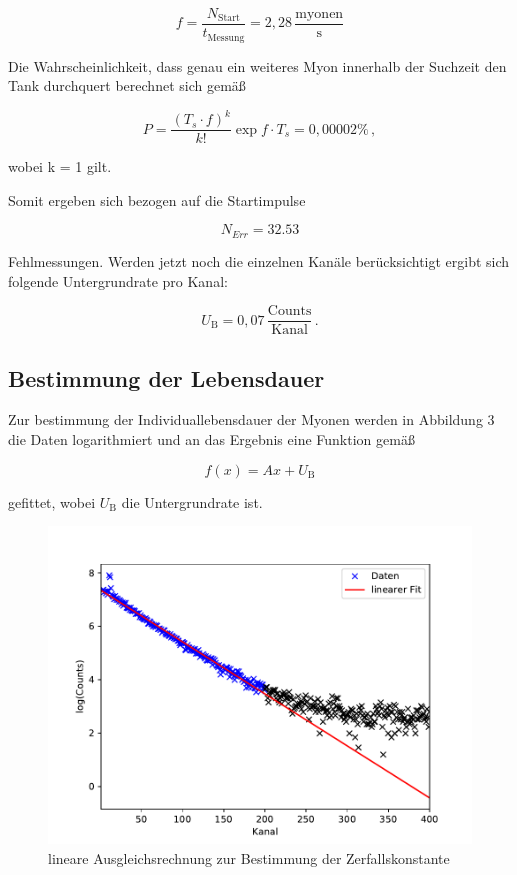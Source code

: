 \begin{equation}
f = \frac{N_{\text{Start}}}{t_{\text{Messung}}} = 2,28 \, \frac{\text{myonen}}{\text{s}}
\end{equation}

\noindent Die Wahrscheinlichkeit, dass genau ein weiteres Myon innerhalb der Suchzeit den Tank durchquert berechnet sich gemäß

\begin{equation}
P = \frac{(T_s \cdot f)^k}{k!} \exp{f \cdot T_s} = 0,00002 \%\,,
\end{equation}


\noindent wobei k = 1 gilt.

\noindent Somit ergeben sich bezogen auf die Startimpulse

\begin{equation}
N_{Err} = 32.53
\end{equation}

\noindent Fehlmessungen. Werden jetzt noch die einzelnen Kanäle berücksichtigt ergibt sich folgende Untergrundrate pro Kanal:

\begin{equation}
U_{\text{B}} = 0,07 \, \frac{\text{Counts}}{\text{Kanal}}\,.
\end{equation}

\subsection{Bestimmung der Lebensdauer}
\label{subsec:lifetime}
Zur bestimmung der Individuallebensdauer der Myonen werden in Abbildung 3 die Daten logarithmiert und an das Ergebnis eine Funktion gemäß

\begin{equation}
f(x) = Ax + U_{\text{B}}
\end{equation}

\noindent gefittet, wobei $U_{\text{B}}$ die Untergrundrate ist.

\begin{figure}[h!]
	\centering
	\includegraphics[width=\textwidth]{img/myons.pdf}
	\caption{lineare Ausgleichsrechnung zur Bestimmung der Zerfallskonstante}
	\label{abb:fit}
\end{figure}

